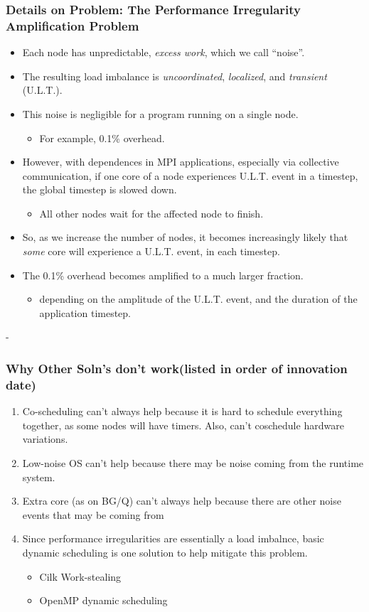 \begin{frame}
\frametitle{Details on Problem: The Performance Irregularity Amplification Problem}
\begin{itemize}
\item \small Each node has unpredictable, \textit{excess work},
which we call ``noise''.  \\
\item \small The resulting load imbalance is  \textit{uncoordinated},
  \textit{localized}, and \textit{transient} (U.L.T.).  \\
\item \small This noise is negligible for a program running on a single node. \\
\begin{itemize}
\item \small For example, 0.1\% overhead.
\end{itemize}
\item However, with dependences in MPI applications, especially via collective communication,
if one core of a node experiences U.L.T. event in a timestep, the global timestep is slowed down.
\begin{itemize}
\item \small All other nodes wait for the affected node to finish.
\end{itemize}
\item \small So, as we increase the number of nodes, it becomes increasingly likely that
\textit{some} core will experience a U.L.T. event, in each timestep.
\item \small The 0.1\% overhead becomes amplified to a much larger fraction.
\begin{itemize}
\item \small depending on the amplitude of the U.L.T. event,
and the duration of the application timestep.
\end{itemize}
\end{itemize}
\end{frame}
-
\begin{frame}
\frametitle{Why Other Soln's don't work(listed in order of innovation date) } 
\begin{enumerate} 
\item \small Co-scheduling can't always help because it is hard to schedule everything together, as some nodes will have timers. Also, can't coschedule hardware variations. 
\item \small Low-noise OS can't help because there may be noise coming from the runtime system.  
\item \small Extra core (as on BG/Q) can't always help because there are other noise events that may be coming from 
\item \small Since performance irregularities are essentially a load imbalnce, basic dynamic scheduling is one solution to help mitigate this problem.  
\begin{itemize}
\item \tiny Cilk Work-stealing 
\item \tiny OpenMP dynamic scheduling
\end{itemize}
\end{enumerate} 
\end{frame} 



